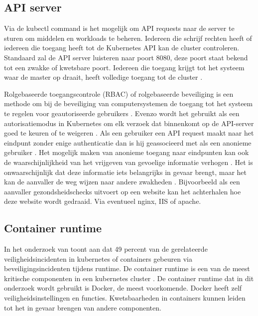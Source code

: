 \subsection{API server}
Via de kubectl command is het mogelijk om API requests naar de server te sturen om middelen en workloads te beheren. Iedereen die schrijf rechten heeft of iedereen die toegang heeft tot de Kubernetes API kan de cluster controleren. 
Standaard zal de API server luisteren naar poort 8080, deze poort staat bekend tot een zwakke of kwetsbare poort. Iedereen die toegang krijgt tot het systeem waar de master op draait, heeft volledige toegang tot de cluster \autocite{Rice2018}. \newline

Rolgebaseerde toegangscontrole (RBAC) of rolgebaseerde beveiliging is een methode om bij de beveiliging van computersystemen de toegang tot het systeem te regelen voor geautoriseerde gebruikers \autocite{mytilinakis2020attack}. Evenzo wordt het gebruikt als een autorisatiemodus in Kubernetes om elk verzoek dat binnenkomt op de API-server goed te keuren of te weigeren \autocite{mytilinakis2020attack}. Als een gebruiker een API request maakt naar het eindpunt zonder enige authenticatie dan is hij geassocieerd met als een anonieme gebruiker \autocite{mytilinakis2020attack}. Het mogelijk maken van anonieme toegang naar eindpunten kan ook de waarschijnlijkheid van het vrijgeven van gevoelige informatie verhogen \autocite{Rice2018}. Het is onwaarschijnlijk dat deze informatie iets belangrijks in gevaar brengt, maar het kan de aanvaller de weg wijzen naar andere zwakheden \autocite{Rice2018}.
Bijvoorbeeld als een aanvaller gezondsheidschecks uitvoert op een website kan het achterhalen hoe deze website wordt gedraaid. Via eventueel nginx, IIS of apache.

\subsection{Container runtime}
In het onderzoek van \textcite{red-hat-2023} toont aan dat 49 percent van de gerelateerde veiligheidsincidenten in kubernetes of containers gebeuren via beveiligingsincidenten tijdens runtime. De container runtime is een van de meest kritische componenten in een kubernetes cluster \autocite{mytilinakis2020attack}. De container runtime dat in dit onderzoek wordt gebruikt is Docker, de meest voorkomende. Docker heeft zelf veiligheidsinstellingen en functies. Kwetsbaarheden in containers kunnen leiden tot het in gevaar brengen van andere componenten. 

